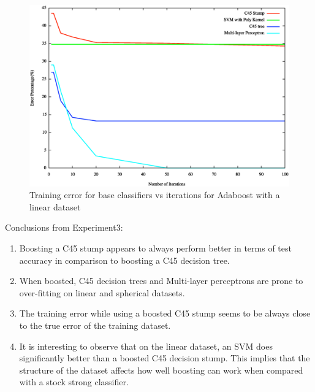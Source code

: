 \documentclass[letterpaper,11pt]{article}
\begin{document}
\begin{figure}[H]
  \centering
  \includegraphics[width=140mm]{modelVsAccuracy-train-linear.eps}
  \caption{Training error for base classifiers vs iterations for Adaboost with a linear dataset}
  \label{fig:modelVsAccuracytrainlinear}
\end{figure}

Conclusions from Experiment3:
\begin{enumerate}
\item Boosting a C45 stump appears to always perform better in terms of test accuracy in comparison to boosting a C45 decision tree. 
\item When boosted, C45 decision trees and Multi-layer perceptrons are prone to over-fitting on linear and spherical datasets. 
\item The training error while using a boosted C45 stump seems to be always close to the true error of the training dataset. 
\item It is interesting to observe that on the linear dataset, an SVM does significantly better than a boosted C45 decision stump. This implies that the structure of the dataset affects how well boosting can work when compared with a stock strong classifier. 
\end{enumerate}
\end{document}
